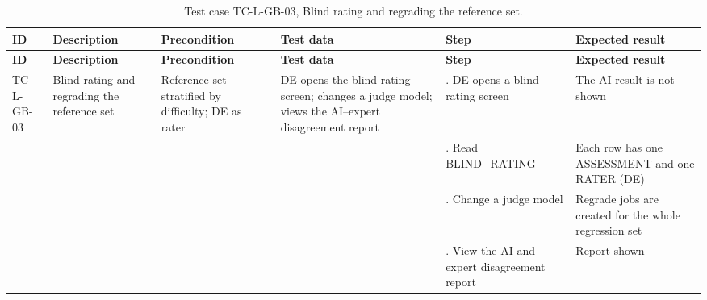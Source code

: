 {\footnotesize{}\renewcommand{\arraystretch}{1.1}
\begin{longtable}{|>{\raggedright\arraybackslash}p{}|>{\raggedright\arraybackslash}p{}|>{\raggedright\arraybackslash}p{}|>{\raggedright\arraybackslash}p{}|>{\raggedright\arraybackslash}p{}|>{\raggedright\arraybackslash}p{}|}
\caption{Test case TC-L-GB-03, Blind rating and regrading the reference set.} \\
\hline
\textbf{ID} & \textbf{Description} & \textbf{Precondition} & \textbf{Test data} & \textbf{Step} & \textbf{Expected result} \\ \hline
\endfirsthead
\hline
\textbf{ID} & \textbf{Description} & \textbf{Precondition} & \textbf{Test data} & \textbf{Step} & \textbf{Expected result} \\ \hline
\endhead
TC-L-GB-03 & Blind rating and regrading the reference set & Reference set stratified by difficulty; DE as rater & DE opens the blind-\allowbreak{}rating screen; changes a judge model; views the AI--expert disagreement report & 1. DE opens a blind-\allowbreak{}rating screen & The AI result is not shown \\ \cline{5-6}
 &  &  &  & 2. Read BLIND\_\allowbreak{}RATING & Each row has one ASSESSMENT and one RATER (DE) \\ \cline{5-6}
 &  &  &  & 3. Change a judge model & Regrade jobs are created for the whole regression set \\ \cline{5-6}
 &  &  &  & 4. View the AI and expert disagreement report & Report shown \\ \hline
\end{longtable}
}

